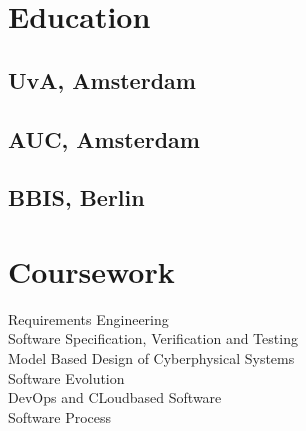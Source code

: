 \documentclass[letterpaper]{deedy-resume} %
\begin{document}
\begin{minipage}[t]{0.33\textwidth} %


\section{Education} 

\subsection{UvA, Amsterdam}

\sectionspace %

\subsection{AUC, Amsterdam}

\sectionspace %

\sectionspace %


\subsection{BBIS, Berlin}

\sectionspace %


\sectionspace %


\section{Coursework}
Requirements Engineering \\
Software Specification, Verification and Testing\\
Model Based Design of Cyber\-physical Systems \\
Software Evolution\\
DevOps and CLoud\-based Software\\
Software Process\\


\end{minipage}
\end{document}
